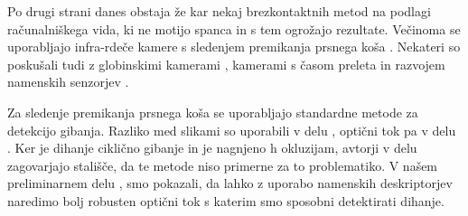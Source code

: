 Po drugi strani danes obstaja že kar nekaj brezkontaktnih metod na podlagi računalniškega vida, ki ne motijo spanca in s tem ogrožajo rezultate. Večinoma se uporabljajo infra-rdeče kamere s sledenjem premikanja prsnega koša \cite{sathyanarayana2015vision}. Nekateri so poskušali tudi z globinskimi kamerami \cite{yang2014sleep}, kamerami s časom preleta \cite{falie2009statistical} in razvojem namenskih senzorjev \cite{takemura2005respiratory}.

Za sledenje premikanja prsnega koša se uporabljajo standardne metode za detekcijo gibanja. Razliko med slikami so uporabili v delu \cite{nakai2000non}, optični tok pa v delu \cite{nakajima2001development}. Ker je dihanje ciklično gibanje in je nagnjeno h okluzijam, avtorji v delu \cite{wang2014unconstrained} zagovarjajo stališče, da te metode niso primerne za to problematiko. V našem preliminarnem delu \cite{koporec2017observation}, smo pokazali, da lahko z uporabo namenskih deskriptorjev naredimo bolj robusten optični tok s katerim smo sposobni detektirati dihanje.